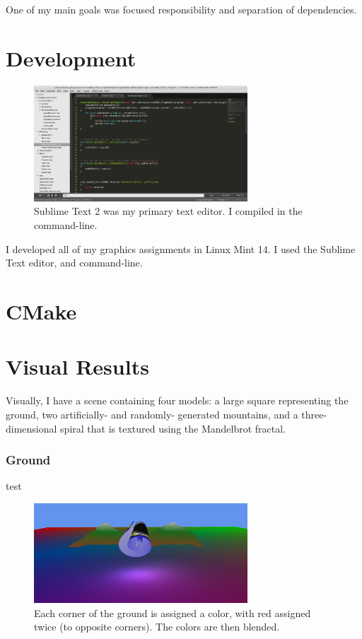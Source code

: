 \documentclass[journal]{IEEEtran}
\begin{document}
One of my main goals was focused responsibility and separation of dependencies.

\section{Development}

\begin{figure}[htbp]
\centering
\fbox
{
	\begin{minipage}{8 cm}
		\includegraphics[width=80mm]{resources/editing_in_sublime.png}
		\caption{Sublime Text 2 was my primary text editor. I compiled in the command-line.}
	\end{minipage}
}
\end{figure}

I developed all of my graphics assignments in Linux Mint 14. I used the Sublime Text editor, and command-line.

\section{CMake}

\section{Visual Results}

Visually, I have a scene containing four models: a large square representing the ground, two artificially- and randomly- generated mountains, and a three-dimensional spiral that is textured using the Mandelbrot fractal.

\subsubsection{Ground} test

\begin{figure}[htbp]
\centering
\fbox
{
	\begin{minipage}{8 cm}
		\includegraphics[width=80mm]{resources/screenshot1.png}
		\caption{Each corner of the ground is assigned a color, with red assigned twice (to opposite corners). The colors are then blended.}
	\end{minipage}
}
\end{figure}
\end{document}
